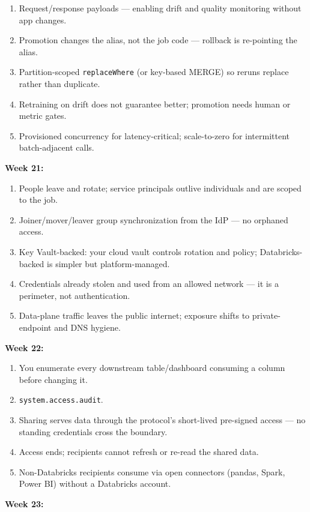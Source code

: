 \documentclass[11pt, a4paper]{article}
\begin{document}
\begin{enumerate}[itemsep=0pt, leftmargin=2em]
    \item Request/response payloads --- enabling drift and quality monitoring without app changes.
    \item Promotion changes the alias, not the job code --- rollback is re-pointing the alias.
    \item Partition-scoped \texttt{replaceWhere} (or key-based MERGE) so reruns replace rather than duplicate.
    \item Retraining on drift does not guarantee better; promotion needs human or metric gates.
    \item Provisioned concurrency for latency-critical; scale-to-zero for intermittent batch-adjacent calls.
\end{enumerate}
\noindent\textbf{Week 21:}
\begin{enumerate}[itemsep=0pt, leftmargin=2em]
    \item People leave and rotate; service principals outlive individuals and are scoped to the job.
    \item Joiner/mover/leaver group synchronization from the IdP --- no orphaned access.
    \item Key Vault-backed: your cloud vault controls rotation and policy; Databricks-backed is simpler but platform-managed.
    \item Credentials already stolen and used from an allowed network --- it is a perimeter, not authentication.
    \item Data-plane traffic leaves the public internet; exposure shifts to private-endpoint and DNS hygiene.
\end{enumerate}
\noindent\textbf{Week 22:}
\begin{enumerate}[itemsep=0pt, leftmargin=2em]
    \item You enumerate every downstream table/dashboard consuming a column before changing it.
    \item \texttt{system.access.audit}.
    \item Sharing serves data through the protocol's short-lived pre-signed access --- no standing credentials cross the boundary.
    \item Access ends; recipients cannot refresh or re-read the shared data.
    \item Non-Databricks recipients consume via open connectors (pandas, Spark, Power BI) without a Databricks account.
\end{enumerate}
\noindent\textbf{Week 23:}
\end{document}
